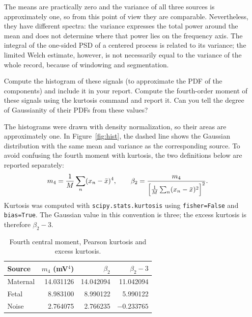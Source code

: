 The means are practically zero and the variance of all three sources is approximately one, so from this point of view they are comparable. Nevertheless, they have different spectra: the variance expresses the total power around the mean and does not determine where that power lies on the frequency axis. The integral of the one-sided PSD of a centered process is related to its variance; the limited Welch estimate, however, is not necessarily equal to the variance of the whole record, because of windowing and segmentation.


\begin{taskbox}
Compute the histogram of these signals (to approximate the PDF of the components) and include it in your report. Compute the fourth-order moment of these signals using the kurtosis command and report it. Can you tell the degree of Gaussianity of their PDFs from these values?
\end{taskbox}

The histograms were drawn with density normalization, so their areas are approximately one. In Figure~\ref{fig:hist}, the dashed line shows the Gaussian distribution with the same mean and variance as the corresponding source. To avoid confusing the fourth moment with kurtosis, the two definitions below are reported separately:
\begin{equation}
m_4 = \frac{1}{M}\sum_{n}(x_n-\bar{x})^4,\qquad
\beta_2 = \frac{m_4}{\Bigl[\frac{1}{M}\sum_{n}(x_n-\bar{x})^2\Bigr]^{2}} .
\label{eq:kurt}
\end{equation}
Kurtosis was computed with \texttt{scipy.stats.kurtosis} using \texttt{fisher=False} and \texttt{bias=True}. The Gaussian value in this convention is three; the excess kurtosis is therefore $\beta_2-3$.

\begin{table}[H]
\centering
\caption{Fourth central moment, Pearson kurtosis and excess kurtosis.}
\begin{tabular}{@{}lrrr@{}}
\toprule
\textbf{Source} & $m_4$ \textbf{(mV$^4$)} & $\beta_2$ & $\beta_2-3$\\
\midrule
Maternal & 14.031126 & 14.042094 & 11.042094\\
Fetal    &  8.983100 &  8.990122 &  5.990122\\
Noise    &  2.764075 &  2.766235 & $-0.233765$\\
\bottomrule
\end{tabular}
\end{table}

